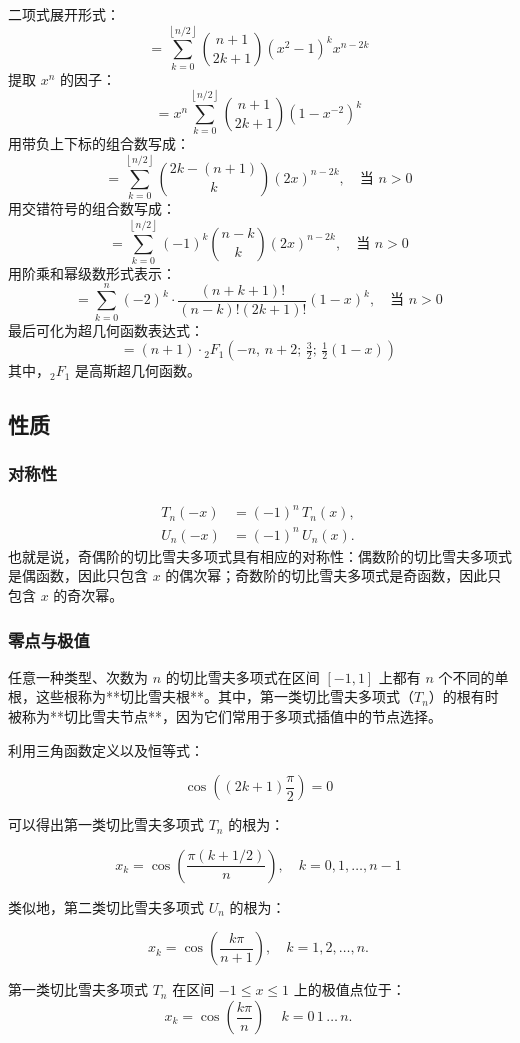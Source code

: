 二项式展开形式：
$$
= \sum_{k=0}^{\left\lfloor n/2 \right\rfloor} \binom{n+1}{2k+1} (x^2 - 1)^k x^{n - 2k}~
$$
提取 $x^n$ 的因子：
$$
= x^n \sum_{k=0}^{\left\lfloor n/2 \right\rfloor} \binom{n+1}{2k+1} \left(1 - x^{-2}\right)^k~
$$
用带负上下标的组合数写成：
$$
= \sum_{k=0}^{\left\lfloor n/2 \right\rfloor} \binom{2k - (n + 1)}{k} (2x)^{n - 2k}, \quad \text{当 } n > 0~
$$
用交错符号的组合数写成：
$$
= \sum_{k=0}^{\left\lfloor n/2 \right\rfloor} (-1)^k \binom{n - k}{k} (2x)^{n - 2k}, \quad \text{当 } n > 0~
$$
用阶乘和幂级数形式表示：
$$
= \sum_{k=0}^{n} (-2)^k \cdot \frac{(n + k + 1)!}{(n - k)! (2k + 1)!} (1 - x)^k, \quad \text{当 } n > 0~
$$
最后可化为超几何函数表达式：
$$
= (n + 1) \cdot {}_2F_1\left(-n,\, n + 2;\, \tfrac{3}{2};\, \tfrac{1}{2}(1 - x)\right)~
$$
其中，${}_2F_1$ 是高斯超几何函数。
\subsection{性质}
\subsubsection{对称性}
$$
\begin{aligned}
T_n(-x) &= (-1)^n\, T_n(x), \\
U_n(-x) &= (-1)^n\, U_n(x).
\end{aligned}~
$$
也就是说，奇偶阶的切比雪夫多项式具有相应的对称性：偶数阶的切比雪夫多项式是偶函数，因此只包含 $x$ 的偶次幂；奇数阶的切比雪夫多项式是奇函数，因此只包含 $x$ 的奇次幂。
\subsubsection{零点与极值}
任意一种类型、次数为 $n$ 的切比雪夫多项式在区间 $[−1, 1]$ 上都有 $n$ 个不同的单根，这些根称为**切比雪夫根**。其中，第一类切比雪夫多项式（$T_n$）的根有时被称为**切比雪夫节点**，因为它们常用于多项式插值中的节点选择。

利用三角函数定义以及恒等式：

$$
\cos\left((2k + 1)\frac{\pi}{2}\right) = 0~
$$

可以得出第一类切比雪夫多项式 $T_n$ 的根为：

$$
x_k = \cos\left(\frac{\pi(k + 1/2)}{n}\right),\quad k = 0, 1, \dots, n - 1~
$$

类似地，第二类切比雪夫多项式 $U_n$ 的根为：

$$
x_k = \cos\left(\frac{k\pi}{n + 1}\right),\quad k = 1, 2, \dots, n.~
$$

第一类切比雪夫多项式 $T_n$ 在区间 $-1 \leq x \leq 1$ 上的极值点位于：
$$
x_k = \cos\left(\frac{k\pi}{n}\right)\,\quad k = 0\, 1\, \dots \, n.~
$$
